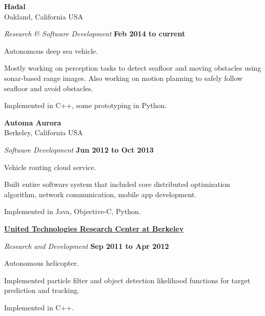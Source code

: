 \textbf{Hadal}\\
Oakland, California USA
\begin{outerlist}
\item[] \textit{Research \& Software Development}%
        \hfill \textbf{Feb 2014 to current}
\begin{innerlist}
\item Autonomous deep sea vehicle.
\item Mostly working on perception tasks to detect seafloor and moving obstacles using sonar-based range images. Also working on motion planning to safely follow seafloor and avoid obstacles.
\item Implemented in C++, some prototyping in Python.
\end{innerlist}
\end{outerlist}

\halfblankline

\textbf{Automa Aurora}\\
Berkeley, California USA
\begin{outerlist}
\item[] \textit{Software Development}%
        \hfill \textbf{Jun 2012 to Oct 2013}
\begin{innerlist}
\item Vehicle routing cloud service.
\item Built entire software system that included core distributed optimization algorithm, network communication, mobile app development.
\item Implemented in Java, Objective-C, Python.
\end{innerlist}
\end{outerlist}

\halfblankline

\href{http://www.utrc.utc.com/}{\textbf{United Technologies Research Center at Berkeley}}
\begin{outerlist}
\item[] \textit{Research and Development}%
        \hfill \textbf{Sep 2011 to Apr 2012}
\begin{innerlist}
\item Autonomous helicopter.
\item Implemented particle filter and object detection likelihood functions for target prediction and tracking.
\item Implemented in C++.
\end{innerlist}
\end{outerlist}

\halfblankline

